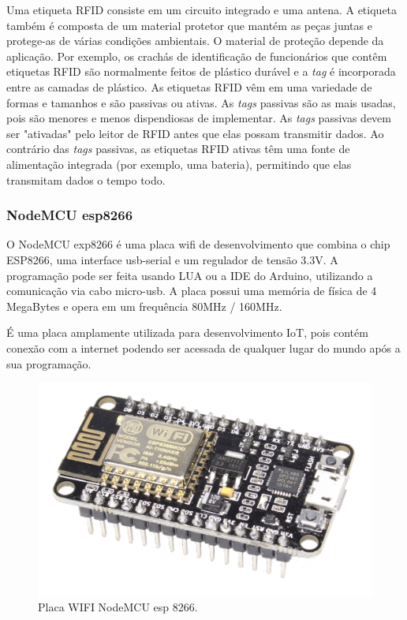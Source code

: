 \documentclass[12pt]{article}
\begin{document}
Uma etiqueta RFID consiste em um circuito integrado e uma antena. A etiqueta também é composta de um material protetor que mantém as peças juntas e protege-as de várias condições ambientais. O material de proteção depende da aplicação. Por exemplo, os crachás de identificação de funcionários que contêm etiquetas RFID são normalmente feitos de plástico durável e a \textit{tag} é incorporada entre as camadas de plástico. As etiquetas RFID vêm em uma variedade de formas e tamanhos e são passivas ou ativas. As \textit{tags} passivas são as mais usadas, pois são menores e menos dispendiosas de implementar. As \textit{tags} passivas devem ser "ativadas" pelo leitor de RFID antes que elas possam transmitir dados. Ao contrário das \textit{tags} passivas, as etiquetas RFID ativas têm uma fonte de alimentação integrada (por exemplo, uma bateria), permitindo que elas transmitam dados o tempo todo.



\subsubsection{NodeMCU esp8266}


O NodeMCU exp8266 é uma placa wifi de desenvolvimento que combina o chip ESP8266, uma interface usb-serial e um regulador de tensão 3.3V. A programação pode ser feita usando LUA ou a IDE do Arduino, utilizando a comunicação via cabo micro-usb. 
A placa possui uma memória de física de 4 MegaBytes e opera em um frequência 80MHz / 160MHz.

É uma placa amplamente utilizada para desenvolvimento IoT, pois contém conexão com a internet podendo ser acessada de qualquer lugar do mundo após a sua programação.

\begin{figure}[H]
\centering
\includegraphics[scale=.3]{node.png}
\caption{Placa WIFI NodeMCU esp 8266.}
\end{figure}
\end{document}
